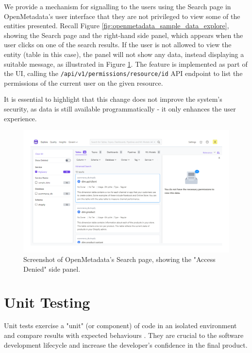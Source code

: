 We provide a mechanism for signalling to the users using the Search page in OpenMetadata's user interface that they are not privileged to view some of the entities presented. Recall Figure \ref{fig:openmetadata_sample_data_explore}, showing the Search page and the right-hand side panel, which appears when the user clicks on one of the search results. If the user is not allowed to view the entity (table in this case), the panel will not show any data, instead displaying a suitable message, as illustrated in Figure \ref{fig:openmetadata_sample_data_explore_denied}. The feature is implemented as part of the UI, calling the \texttt{/api/v1/permissions/{resource}/{id}} API endpoint to list the permissions of the current user on the given resource.

It is essential to highlight that this change does not improve the system's security, as data is still available programmatically - it only enhances the user experience.

\begin{figure}
    \centering
    \includegraphics[width=\textwidth]{chapters/implementation/figures/openmetadata_sample_data_explore_denied.pdf}
    \caption{Screenshot of OpenMetadata's Search page, showing the "Access Denied" side panel.}
    \label{fig:openmetadata_sample_data_explore_denied}
\end{figure}

\section{Unit Testing}

Unit tests exercise a "unit" (or component) of code in an isolated environment and compare results with expected behaviours \cite{unitTestingOlan2003}. They are crucial to the software development lifecycle and increase the developer's confidence in the final product.

